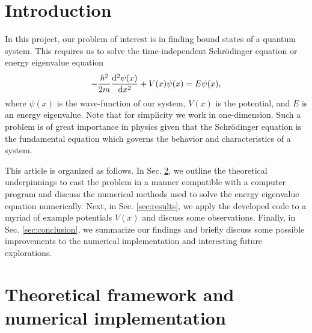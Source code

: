 
\def\HWnum{Project 3}
\def\duedate{November 10, 2024}




\section{Introduction}
\label{sec:introduction}

In this project, our problem of interest is in finding bound states of a quantum system.
This requires us to solve the time-independent Schr\"{o}dinger equation or energy eigenvalue equation
\begin{align}
    -\frac{\hbar^2}{2m} \dv[2]{\psi(x)}{x} + V(x) \psi(x) = E \psi(x)
,\end{align}
where $\psi(x)$ is the wave-function of our system, $V(x)$ is the potential, and $E$ is an energy eigenvalue.
Note that for simplicity we work in one-dimension.
Such a problem is of great importance in physics given that the Schr\"{o}dinger equation is the fundamental equation which governs the behavior and characteristics of a system.

This article is organized as follows.
In Sec. \ref{sec:theoretical-framework-and-numerical-implementation}, we outline the theoretical underpinnings to cast the problem in a manner compatible with a computer program and discuss the numerical methods used to solve the energy eigenvalue equation numerically.
Next, in Sec. \ref{sec:results}, we apply the developed code to a myriad of example potentials $V(x)$ and discuss some observations.
Finally, in Sec. \ref{sec:conclusion}, we summarize our findings and briefly discuss some possible improvements to the numerical implementation and interesting future explorations.


\section{Theoretical framework and numerical implementation}
\label{sec:theoretical-framework-and-numerical-implementation}

